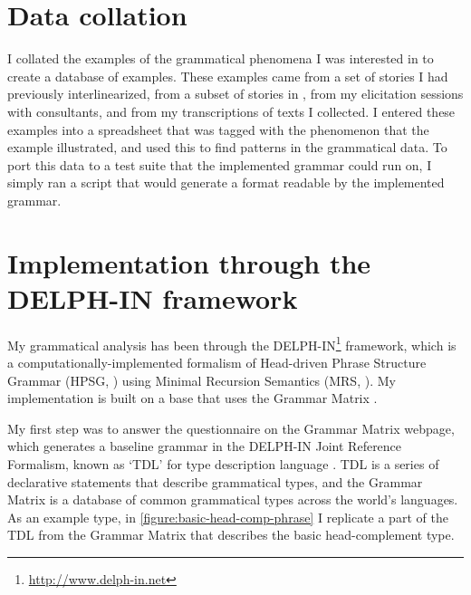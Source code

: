 \section{Data collation} \label{ch:method:collation}

I collated the examples of the grammatical phenomena I was interested in to create a database of examples. These examples came from a set of stories I had previously interlinearized, from a subset of stories in \citet{sapir1939}, from my elicitation sessions with consultants, and from my transcriptions of texts I collected. I entered these examples into a spreadsheet that was tagged with the phenomenon that the example illustrated, and used this to find patterns in the grammatical data. To port this data to a test suite that the implemented grammar could run on, I simply ran a script that would generate a format readable by the implemented grammar.

\section{Implementation through the DELPH-IN framework} \label{ch:method:delphin}

My grammatical analysis has been through the DELPH-IN\footnote{\url{http://www.delph-in.net}} framework, which is a computationally-implemented formalism of Head-driven Phrase Structure Grammar (HPSG, \citealt{pollardsag1994}) using Minimal Recursion Semantics (MRS, \citealt{copestake2005}). My implementation is built on a base that uses the Grammar Matrix \citep{bender2002, flickinger2003, benderetal2010}.

My first step was to answer the questionnaire on the Grammar Matrix webpage, which generates a baseline grammar in the DELPH-IN Joint Reference Formalism, known as `TDL' for type description language \citep{copestake2002b}. TDL is a series of declarative statements that describe grammatical types, and the Grammar Matrix is a database of common grammatical types across the world's languages. As an example type, in \cref{figure:basic-head-comp-phrase} I replicate a part of the TDL from the Grammar Matrix that describes the basic head-complement type.


